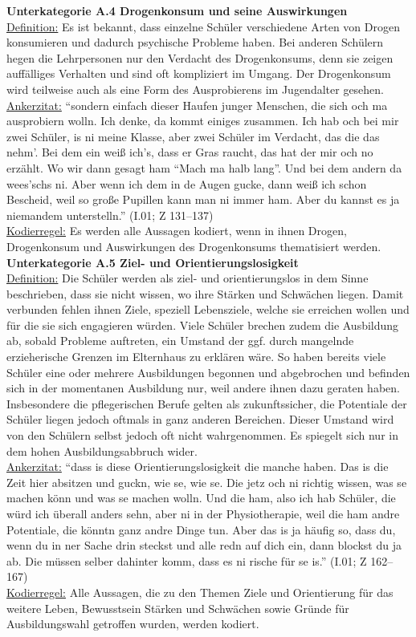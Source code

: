 \noindent
\textbf{Unterkategorie A.4 Drogenkonsum und seine Auswirkungen}\\
\underline{Definition:} Es ist bekannt, dass einzelne Schüler verschiedene Arten von Drogen konsumieren und dadurch psychische Probleme haben. Bei anderen Schülern hegen die Lehrpersonen nur den Verdacht des Drogenkonsums, denn sie zeigen auffälliges Verhalten und sind oft kompliziert im Umgang. Der Drogenkonsum wird teilweise auch als eine Form des Ausprobierens im Jugendalter gesehen.\\
\underline{Ankerzitat:} "`sondern einfach dieser Haufen junger Menschen, die sich och ma ausprobiern wolln. Ich denke, da kommt einiges zusammen. Ich hab och bei mir zwei Schüler, is ni meine Klasse, aber zwei Schüler im Verdacht, das die das nehm'. Bei dem ein weiß ich's, dass er Gras raucht, das hat der mir och no erzählt. Wo wir dann gesagt ham "`Mach ma halb lang"'. Und bei dem andern da wees'schs ni. Aber wenn ich dem in de Augen gucke, dann weiß ich schon Bescheid, weil so große Pupillen kann man ni immer ham. Aber du kannst es ja niemandem unterstelln."' (I.01; Z 131--137)\\
\underline{Kodierregel:} Es werden alle Aussagen kodiert, wenn in ihnen Drogen, Drogenkonsum und Auswirkungen des Drogenkonsums thematisiert werden.\\

\noindent
\textbf{Unterkategorie A.5 Ziel- und Orientierungslosigkeit}\\
\underline{Definition:} Die Schüler werden als ziel- und orientierungslos in dem Sinne beschrieben, dass sie nicht wissen, wo ihre Stärken und Schwächen liegen. Damit verbunden fehlen ihnen Ziele, speziell Lebensziele, welche sie erreichen wollen und für die sie sich engagieren würden. Viele Schüler brechen zudem die Ausbildung ab, sobald Probleme auftreten, ein Umstand der ggf. durch mangelnde erzieherische Grenzen im Elternhaus zu erklären wäre. So haben bereits viele Schüler eine oder mehrere Ausbildungen begonnen und abgebrochen und befinden sich in der momentanen Ausbildung nur, weil andere ihnen dazu geraten haben. Insbesondere die pflegerischen Berufe gelten als zukunftssicher, die Potentiale der Schüler liegen jedoch oftmals in ganz anderen Bereichen. Dieser Umstand wird von den Schülern selbst jedoch oft nicht wahrgenommen. Es spiegelt sich nur in dem hohen Ausbildungsabbruch wider.\\
\underline{Ankerzitat:} "`dass is diese Orientierungslosigkeit die manche haben. Das is die Zeit hier absitzen und guckn, wie se, wie se. Die jetz och ni richtig wissen, was se machen könn und was se machen wolln. Und die ham, also ich hab Schüler, die würd ich überall anders sehn, aber ni in der Physiotherapie, weil die ham andre Potentiale, die könntn ganz andre Dinge tun. Aber das is ja häufig so, dass du, wenn du in ner Sache drin steckst und alle redn auf dich ein, dann blockst du ja ab. Die müssen selber dahinter komm, dass es ni rische für se is."' (I.01; Z 162--167)\\
\underline{Kodierregel:} Alle Aussagen, die zu den Themen Ziele und Orientierung für das weitere Leben, Bewusstsein Stärken und Schwächen sowie Gründe für Ausbildungswahl getroffen wurden, werden kodiert. \\

